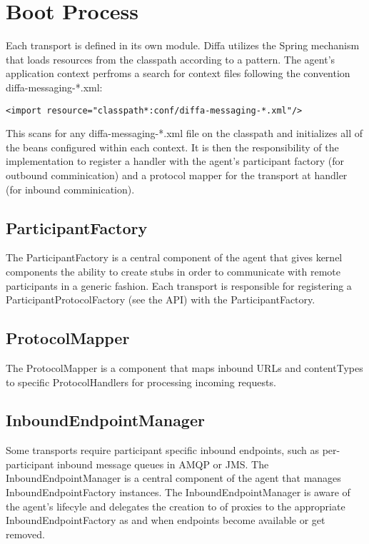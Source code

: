 \section{Boot Process}

Each transport is defined in its own module. Diffa utilizes the Spring mechanism that loads resources from the classpath according to a pattern. The agent's application context perfroms a search for context files following the convention diffa-messaging-*.xml:

\begin{lstlisting}
<import resource="classpath*:conf/diffa-messaging-*.xml"/>
\end{lstlisting}

This scans for any diffa-messaging-*.xml file on the classpath and initializes all of the beans configured within each context. It is then the responsibility of the implementation to register a handler with the agent's participant factory (for outbound comminication) and a protocol mapper for the transport at handler (for inbound comminication).

\subsection{ParticipantFactory}

The ParticipantFactory is a central component of the agent that gives kernel components the ability to create stubs in order to communicate with remote participants in a generic fashion. Each transport is responsible for registering a ParticipantProtocolFactory (see the API) with the ParticipantFactory. 

\subsection{ProtocolMapper}

The ProtocolMapper is a component that maps inbound URLs and contentTypes to specific ProtocolHandlers for processing incoming requests.

\subsection{InboundEndpointManager}

Some transports require participant specific inbound endpoints, such as per-participant inbound message queues in AMQP or JMS. The InboundEndpointManager is a central component of the agent that manages InboundEndpointFactory instances. The InboundEndpointManager is aware of the agent's lifecyle and delegates the creation to of proxies to the appropriate InboundEndpointFactory as and when endpoints become available or get removed.

